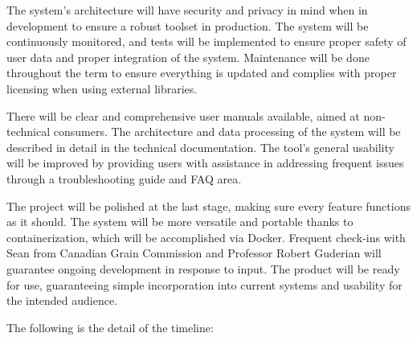 \documentclass[12pt]{article}
\begin{document}
The system’s architecture will have security and privacy in mind when in development to ensure a robust toolset in production. The system will be continuously monitored, and tests will be implemented to ensure proper safety of user data and proper integration of the system. Maintenance will be done throughout the term to ensure everything is updated and complies with proper licensing when using external libraries. 

There will be clear and comprehensive user manuals available, aimed at non-technical consumers. The architecture and data processing of the system will be described in detail in the technical documentation. The tool's general usability will be improved by providing users with assistance in addressing frequent issues through a troubleshooting guide and FAQ area.

The project will be polished at the last stage, making sure every feature functions as it should. The system will be more versatile and portable thanks to containerization, which will be accomplished via Docker. Frequent check-ins with Sean from Canadian Grain Commission and Professor Robert Guderian will guarantee ongoing development in response to input. The product will be ready for use, guaranteeing simple incorporation into current systems and usability for the intended audience.

The following is the detail of the timeline:
\end{document}
